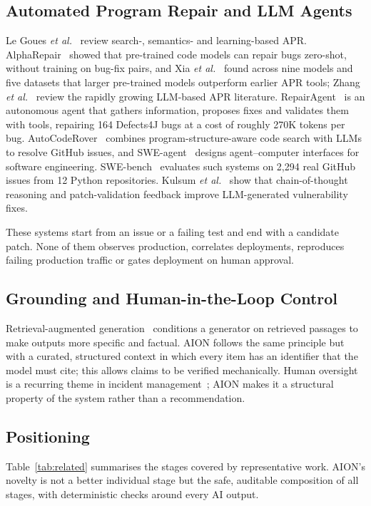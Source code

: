 \documentclass[conference]{IEEEtran}
\begin{document}
\subsection{Automated Program Repair and LLM Agents}
Le Goues \emph{et al.}~\cite{legoues2019apr} review search-, semantics- and learning-based APR. AlphaRepair~\cite{xia2022alpharepair} showed that pre-trained code models can repair bugs zero-shot, without training on bug-fix pairs, and Xia \emph{et al.}~\cite{xia2023apr} found across nine models and five datasets that larger pre-trained models outperform earlier APR tools; Zhang \emph{et al.}~\cite{zhang2024slr} review the rapidly growing LLM-based APR literature. RepairAgent~\cite{bouzenia2025repairagent} is an autonomous agent that gathers information, proposes fixes and validates them with tools, repairing 164 Defects4J bugs at a cost of roughly 270K tokens per bug. AutoCodeRover~\cite{zhang2024autocoderover} combines program-structure-aware code search with LLMs to resolve GitHub issues, and SWE-agent~\cite{yang2024sweagent} designs agent--computer interfaces for software engineering. SWE-bench~\cite{jimenez2024swebench} evaluates such systems on 2,294 real GitHub issues from 12 Python repositories. Kulsum \emph{et al.}~\cite{kulsum2024vrpilot} show that chain-of-thought reasoning and patch-validation feedback improve LLM-generated vulnerability fixes.

These systems start from an issue or a failing test and end with a candidate patch. None of them observes production, correlates deployments, reproduces failing production traffic or gates deployment on human approval.

\subsection{Grounding and Human-in-the-Loop Control}
Retrieval-augmented generation~\cite{lewis2020rag} conditions a generator on retrieved passages to make outputs more specific and factual. AION follows the same principle but with a curated, structured context in which every item has an identifier that the model must cite; this allows claims to be verified mechanically. Human oversight is a recurring theme in incident management~\cite{chen2020icm,ahmed2023recommending}; AION makes it a structural property of the system rather than a recommendation.

\subsection{Positioning}
Table~\ref{tab:related} summarises the stages covered by representative work. AION's novelty is not a better individual stage but the safe, auditable composition of all stages, with deterministic checks around every AI output.
\end{document}
